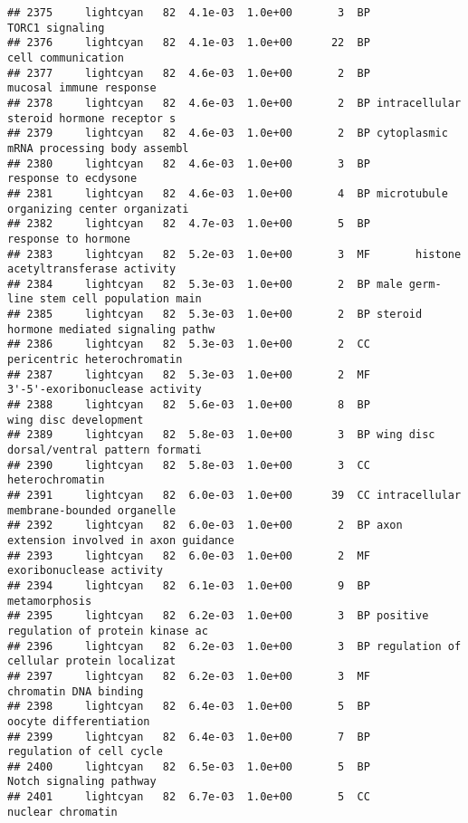 \documentclass[]{article}
\begin{document}
\begin{verbatim}
## 2375     lightcyan   82  4.1e-03  1.0e+00       3  BP                          TORC1 signaling
## 2376     lightcyan   82  4.1e-03  1.0e+00      22  BP                       cell communication
## 2377     lightcyan   82  4.6e-03  1.0e+00       2  BP                  mucosal immune response
## 2378     lightcyan   82  4.6e-03  1.0e+00       2  BP intracellular steroid hormone receptor s
## 2379     lightcyan   82  4.6e-03  1.0e+00       2  BP cytoplasmic mRNA processing body assembl
## 2380     lightcyan   82  4.6e-03  1.0e+00       3  BP                     response to ecdysone
## 2381     lightcyan   82  4.6e-03  1.0e+00       4  BP microtubule organizing center organizati
## 2382     lightcyan   82  4.7e-03  1.0e+00       5  BP                      response to hormone
## 2383     lightcyan   82  5.2e-03  1.0e+00       3  MF       histone acetyltransferase activity
## 2384     lightcyan   82  5.3e-03  1.0e+00       2  BP male germ-line stem cell population main
## 2385     lightcyan   82  5.3e-03  1.0e+00       2  BP steroid hormone mediated signaling pathw
## 2386     lightcyan   82  5.3e-03  1.0e+00       2  CC              pericentric heterochromatin
## 2387     lightcyan   82  5.3e-03  1.0e+00       2  MF           3'-5'-exoribonuclease activity
## 2388     lightcyan   82  5.6e-03  1.0e+00       8  BP                    wing disc development
## 2389     lightcyan   82  5.8e-03  1.0e+00       3  BP wing disc dorsal/ventral pattern formati
## 2390     lightcyan   82  5.8e-03  1.0e+00       3  CC                          heterochromatin
## 2391     lightcyan   82  6.0e-03  1.0e+00      39  CC intracellular membrane-bounded organelle
## 2392     lightcyan   82  6.0e-03  1.0e+00       2  BP axon extension involved in axon guidance
## 2393     lightcyan   82  6.0e-03  1.0e+00       2  MF                 exoribonuclease activity
## 2394     lightcyan   82  6.1e-03  1.0e+00       9  BP                            metamorphosis
## 2395     lightcyan   82  6.2e-03  1.0e+00       3  BP positive regulation of protein kinase ac
## 2396     lightcyan   82  6.2e-03  1.0e+00       3  BP regulation of cellular protein localizat
## 2397     lightcyan   82  6.2e-03  1.0e+00       3  MF                    chromatin DNA binding
## 2398     lightcyan   82  6.4e-03  1.0e+00       5  BP                   oocyte differentiation
## 2399     lightcyan   82  6.4e-03  1.0e+00       7  BP                 regulation of cell cycle
## 2400     lightcyan   82  6.5e-03  1.0e+00       5  BP                  Notch signaling pathway
## 2401     lightcyan   82  6.7e-03  1.0e+00       5  CC                        nuclear chromatin

\end{verbatim}
\end{document}
